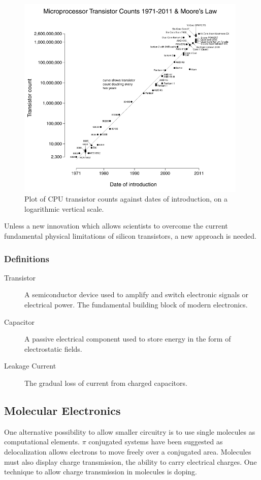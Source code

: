 \documentclass[12pt]{article}
\begin{document}
\begin{figure}[ht!]
\centering
\includegraphics[width=110mm]{MooresLaw.png}
\caption{Plot of CPU transistor counts against dates of introduction, on a logarithmic vertical scale.}
\label{fig:MooresLaw}
\end{figure}

Unless a new innovation which allows scientists to overcome the current fundamental physical limitations of silicon transistors, a new approach is needed. 

\subsubsection{Definitions}

\begin{description}
\item[Transistor] A semiconductor device used to amplify and switch electronic signals or electrical power. The fundamental building block of modern electronics.
\item[Capacitor] A passive electrical component used to store energy in the form of electrostatic fields.
\item[Leakage Current] The gradual loss of current from charged capacitors. 
\end{description}

\subsection{Molecular Electronics}

One alternative possibility to allow smaller circuitry is to use single molecules as computational elements. $\pi$ conjugated systems have been suggested as delocalization allows electrons to move freely over a conjugated area. Molecules must also display charge transmission, the ability to carry electrical charges. One technique to allow charge transmission in molecules is doping. 
\end{document}
